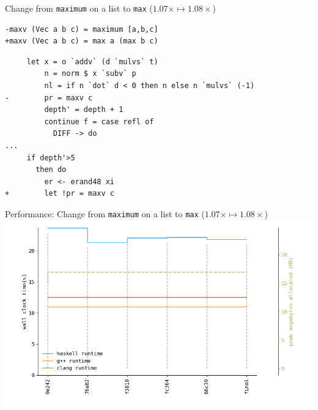 \documentclass[8pt]{beamer}
\begin{document}
\begin{frame}[fragile]{ Change from \texttt{maximum} on a list to \texttt{max} ($1.07\times \mapsto 1.08\times$)}
\begin{verbatim}
-maxv (Vec a b c) = maximum [a,b,c]
+maxv (Vec a b c) = max a (max b c)
\end{verbatim}

\begin{verbatim}
     let x = o `addv` (d `mulvs` t)
         n = norm $ x `subv` p
         nl = if n `dot` d < 0 then n else n `mulvs` (-1)
-        pr = maxv c
         depth' = depth + 1
         continue f = case refl of
           DIFF -> do
...
     if depth'>5
       then do
         er <- erand48 xi
+        let !pr = maxv c
\end{verbatim}

\end{frame}

\begin{frame}[fragile]{Performance: Change from \texttt{maximum} on a list to \texttt{max}  ($1.07\times \mapsto  1.08\times$)}
\includegraphics[height=0.6\textwidth]{perfdata-upto-66c39-gen.png}
\end{frame}
\end{document}
